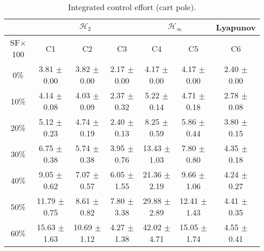 \begin{table}[H]
\centering
\scriptsize
\begin{tabular}{| c || c | c | c | c | c | c |}
	\hline
	 & \multicolumn{3}{c|}{$\mathcal{H}_{2}$} & \multicolumn{2}{c|}{$\mathcal{H}_{\infty}$} & Lyapunov\\
	\hline
	SF$\times$100 & C1& C2 & C3 & C4 & C5 & C6\\
	\hline\hline
	0\% & 3.81 $\pm$ 0.00 & 3.82 $\pm$ 0.00 & 2.17 $\pm$ 0.00 & 4.17 $\pm$ 0.00 & 4.17 $\pm$ 0.00 & 2.40 $\pm$ 0.00\\
	\hline
	10\% & 4.14 $\pm$ 0.08 & 4.03 $\pm$ 0.09 & 2.37 $\pm$ 0.32 & 5.22 $\pm$ 0.14 & 4.71 $\pm$ 0.18 & 2.78 $\pm$ 0.08\\
	\hline
	20\% & 5.12 $\pm$ 0.23 & 4.74 $\pm$ 0.19 & 2.40 $\pm$ 0.13 & 8.25 $\pm$ 0.59 & 5.86 $\pm$ 0.44 & 3.80 $\pm$ 0.15\\
	\hline
	30\% & 6.75 $\pm$ 0.38 & 5.74 $\pm$ 0.38 & 3.95 $\pm$ 0.76 & 13.43 $\pm$ 1.03 & 7.80 $\pm$ 0.80 & 4.35 $\pm$ 0.18\\
	\hline
	40\% & 9.05 $\pm$ 0.62 & 7.07 $\pm$ 0.57 & 6.05 $\pm$ 1.55 & 21.36 $\pm$ 2.19 & 9.66 $\pm$ 1.06 & 4.24 $\pm$ 0.27\\
	\hline
	50\% & 11.79 $\pm$ 0.75 & 8.61 $\pm$ 0.82 & 7.80 $\pm$ 3.38 & 29.88 $\pm$ 2.89 & 12.41 $\pm$ 1.43 & 4.41 $\pm$ 0.35\\
	\hline
	60\% & 15.63 $\pm$ 1.63 & 10.69 $\pm$ 1.12 & 4.27 $\pm$ 1.38 & 42.02 $\pm$ 4.71 & 15.05 $\pm$ 1.74 & 4.55 $\pm$ 0.41\\
	\hline
\end{tabular}
\caption{Integrated control effort (cart pole).}
\label{table:control_effort_cart_pole:noise}
\end{table}

